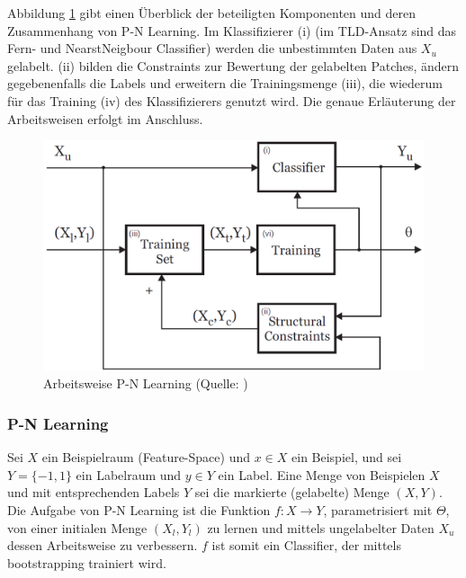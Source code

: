 	Abbildung \ref{abb:pnl} gibt einen Überblick der beteiligten Komponenten und deren Zusammenhang von P-N Learning. Im Klassifizierer (i) (im	TLD-Ansatz sind das Fern- und NearstNeigbour Classifier) werden die unbestimmten Daten aus $X_{u}$ gelabelt. (ii) bilden die Constraints zur Bewertung der gelabelten Patches, ändern gegebenenfalls die Labels und erweitern die Trainingsmenge (iii), die wiederum für das Training (iv) des Klassifizierers genutzt wird. Die genaue Erläuterung der Arbeitsweisen erfolgt im Anschluss.

	\begin{figure}
	\begin{centering}
	\includegraphics[scale=0.4]{../pictures/PN_LEARNING.png}\caption{Arbeitsweise P-N Learning (Quelle: \cite{PNL})}
	\label{abb:pnl}
	\par\end{centering}
	\end{figure}

	\subsubsection{P-N Learning}

	Sei $X$ ein Beispielraum (Feature-Space) und $x\in X$ ein Beispiel, und sei $Y=\{-1,1\}$ ein Labelraum und $y\in Y$ ein Label. Eine Menge von Beispielen $X$ und mit entsprechenden Labels $Y$ sei die markierte (gelabelte) Menge $(X,Y)$. Die Aufgabe von P-N Learning ist die Funktion $f:X\rightarrow Y$, parametrisiert mit $\Theta$, von einer initialen Menge $(X_{l},Y_{l})$ zu lernen und mittels ungelabelter Daten $X_{u}$ dessen Arbeitsweise zu verbessern. $f$ ist somit ein Classifier, der mittels bootstrapping trainiert wird.

